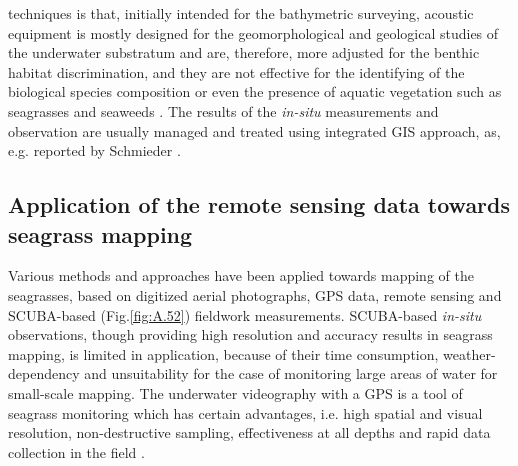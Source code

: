 \documentclass[11pt]{article}
\begin{document}
techniques is that, initially intended for the bathymetric surveying, acoustic equipment is mostly designed for the geomorphological and geological studies of the underwater substratum and are, therefore, more adjusted for the benthic habitat discrimination, and they are not effective for the identifying of the biological species composition or even the presence of aquatic vegetation such as seagrasses and seaweeds \cite{Werdell03}\label{Werdell03}. The results of the \textit{in-situ} measurements and observation are usually
managed and treated using integrated \ac{GIS} approach, as, e.g. reported by Schmieder \cite{Schmieder97}\label{Schmieder97}.

\subsection[Application of the remote sensing...]{Application of the remote sensing data towards seagrass mapping}\label{page-15}
Various methods and approaches have been applied towards mapping of the seagrasses, based on
digitized aerial photographs, \ac{GPS} data, remote sensing and \ac{SCUBA}-based (Fig.\ref{fig:A.52}) fieldwork measurements.
\ac{SCUBA}-based \textit{in-situ} observations, though providing high resolution and accuracy results in seagrass
mapping, is limited in application, because of their time consumption, weather-dependency and
unsuitability for the case of monitoring large areas of water for small-scale mapping. 
The underwater videography with a \ac{GPS} is a tool of seagrass monitoring which has certain advantages, i.e.
high spatial and visual resolution, non-destructive sampling, effectiveness at all depths and rapid data
collection in the field \cite{Schultz08}\label{Schultz08}. 
\end{document}
